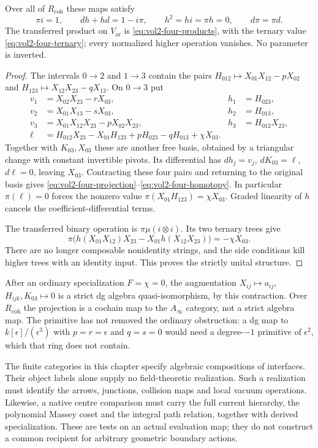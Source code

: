 \begin{theorem}\label{thm:vol2-four-contraction}
Over all of $R_{\mathrm{coh}}$ these maps satisfy
\[
 \pi i=1,\qquad dh+hd=1-i\pi,\qquad
 h^2=hi=\pi h=0,\qquad d\pi=\pi d.
\]
The transferred product on $V_{\mathrm{ar}}$ is
\eqref{eq:vol2-four-products}, with the ternary value
\eqref{eq:vol2-four-ternary}; every normalized higher
operation vanishes. No parameter is inverted.
\end{theorem}
\begin{proof}
The intervals $0\to2$ and $1\to3$ contain the pairs
$H_{012}\mapsto X_{01}X_{12}-pX_{02}$ and
$H_{123}\mapsto X_{12}X_{23}-qX_{13}$.
On $0\to3$ put
\begin{align*}
 v_1&=X_{02}X_{23}-rX_{03},& h_1&=H_{023},\\
 v_2&=X_{01}X_{13}-sX_{03},& h_2&=H_{013},\\
 v_3&=X_{01}X_{12}X_{23}-pX_{02}X_{23},& h_3&=H_{012}X_{23},\\
 \ell&=H_{012}X_{23}-X_{01}H_{123}
                   +pH_{023}-qH_{013}+\chi X_{03}.
\end{align*}
Together with $K_{03},X_{03}$ these are another free basis,
obtained by a triangular change with constant invertible
pivots. Its differential has $dh_j=v_j$, $dK_{03}=\ell$,
$d\ell=0$, leaving $X_{03}$. Contracting these four pairs
and returning to the original basis gives
\eqref{eq:vol2-four-projection}--\eqref{eq:vol2-four-homotopy}.
In particular $\pi(\ell)=0$ forces the nonzero value
$\pi(X_{01}H_{123})=\chi X_{03}$. Graded linearity of $h$
cancels the coefficient-differential terms.

The transferred binary operation is $\pi\mu(i\otimes i)$.
Its two ternary trees give
\[
 \pi\bigl(h(X_{01}X_{12})X_{23}
                   -X_{01}h(X_{12}X_{23})\bigr)=-\chi X_{03}.
\]
There are no longer composable nonidentity strings, and the
side conditions kill higher trees with an identity input.
This proves the strictly unital structure.
\end{proof}

After an ordinary specialization $F=\chi=0$, the augmentation
$X_{ij}\mapsto a_{ij}$, $H_{ijk},K_{03}\mapsto0$ is a strict
dg algebra quasi-isomorphism, by this contraction. Over
$R_{\mathrm{coh}}$ the projection is a cochain map to the
$A_\infty$ category, not a strict algebra map.
The primitive has not removed the ordinary obstruction:
a dg map to $k[\epsilon]/(\epsilon^3)$ with $p=r=\epsilon$
and $q=s=0$ would need a degree-$-1$ primitive of
$\epsilon^2$, which that ring does not contain.

The finite categories in this chapter specify algebraic
compositions of interfaces. Their object labels alone supply
no field-theoretic realization. Such a realization must
identify the arrows, junctions, collision maps and local
vacuum operations. Likewise, a native centre comparison must
carry the full current hierarchy, the polynomial Massey
coset and the integral path relation, together with derived
specialization. These are tests on an actual evaluation map;
they do not construct a common recipient for arbitrary
geometric boundary actions.
